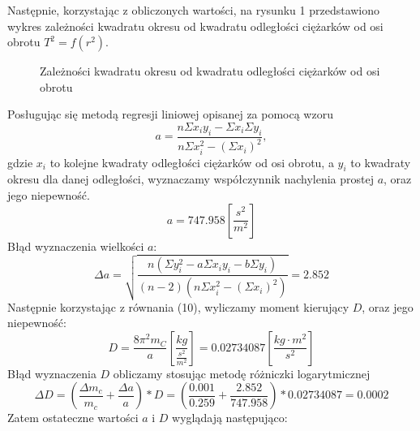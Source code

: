 \documentclass[10pt,a4paper]{article}
\newcommand{\forceindent}{\leavevmode{\parindent=3em\indent}}
\begin{document}
\forceindent Następnie, korzystając z obliczonych wartości, na rysunku 1 przedstawiono wykres zależności kwadratu okresu od kwadratu odległości ciężarków od osi obrotu $T^2 = f(r^2)$.

\begin{figure}[!h]
\centering
{}
\caption{Zależności kwadratu okresu od kwadratu odległości ciężarków od osi obrotu}
\label{fig:wyk}
\end{figure}

\forceindent Posługując się metodą regresji liniowej opisanej za pomocą wzoru 
\begin{equation}
a=\frac{n\Sigma x_i y_i - \Sigma x_i \Sigma y_i}{n\Sigma x_i^2 - (\Sigma x_i)^2},
\end{equation}
gdzie $x_i$ to kolejne kwadraty odległości ciężarków od osi obrotu, a $y_i$ to kwadraty okresu dla danej odległości, wyznaczamy współczynnik nachylenia prostej $a$, oraz jego niepewność. 
\begin{equation}
a = 747.958 \left[\frac{s^2}{m^2}\right]
\end{equation}
Błąd wyznaczenia wielkości $a$:\\
$$ \Delta a = \sqrt{\frac{n(\Sigma y_i ^2 - a \Sigma x_i y_i - b\Sigma y_i)}{(n-2)(n \Sigma x_i ^2 - (\Sigma x_i)^2)}} = 2.852$$
Następnie korzystając z równania (10), wyliczamy moment kierujący $D$, oraz jego niepewność:
\begin{equation}
D=\frac{8\pi^2m_{C}}{a} \left[\frac{kg}{\frac{s^2}{m^2}}\right] = 0.02734087 \left[\frac{kg\cdot m^2}{s^2}\right]
\end{equation}
Błąd wyznaczenia $D$ obliczamy stosując metodę różniczki logarytmicznej
$$ \Delta D = (\frac{\Delta m_c}{m_c} + \frac{\Delta a}{a}) * D = (\frac{0.001}{0.259} + \frac{2.852}{747.958})*0.02734087 = 0.0002$$
\forceindent Zatem ostateczne wartości $a$ i $D$ wyglądają następująco:
\end{document}
